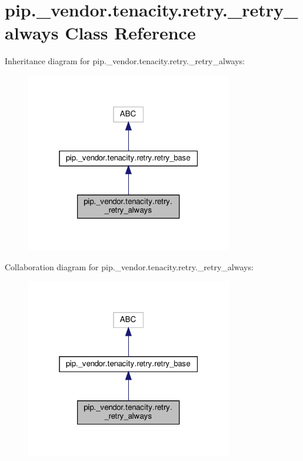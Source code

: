 \hypertarget{classpip_1_1__vendor_1_1tenacity_1_1retry_1_1__retry__always}{}\section{pip.\+\_\+vendor.\+tenacity.\+retry.\+\_\+retry\+\_\+always Class Reference}
\label{classpip_1_1__vendor_1_1tenacity_1_1retry_1_1__retry__always}


Inheritance diagram for pip.\+\_\+vendor.\+tenacity.\+retry.\+\_\+retry\+\_\+always\+:
\nopagebreak
\begin{figure}[H]
\begin{center}
\leavevmode
\includegraphics[width=256pt]{classpip_1_1__vendor_1_1tenacity_1_1retry_1_1__retry__always__inherit__graph}
\end{center}
\end{figure}


Collaboration diagram for pip.\+\_\+vendor.\+tenacity.\+retry.\+\_\+retry\+\_\+always\+:
\nopagebreak
\begin{figure}[H]
\begin{center}
\leavevmode
\includegraphics[width=256pt]{classpip_1_1__vendor_1_1tenacity_1_1retry_1_1__retry__always__coll__graph}
\end{center}
\end{figure}
